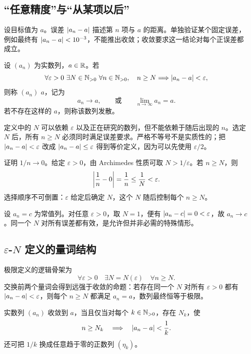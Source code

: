 \subsection{“任意精度”与“从某项以后”}

设目标值为 \(a\)。误差 \(\left|a_n-a\right|\) 描述第 \(n\) 项与 \(a\) 的距离。单独验证某个固定误差，例如最终有 \(\left|a_n-a\right|<10^{-3}\)，不能推出收敛；收敛要求这一结论对每个正误差都成立。

\begin{definition}[数列极限]
设 \((a_n)\) 为实数列，\(a\in\mathbb{R}\)。若
\[
\forall\varepsilon>0\ \exists N\in\Npos\ \forall n\in\Npos,
 \quad n\ge N\Longrightarrow\abs{a_n-a}<\varepsilon,
\]
则称 \((a_n)\)  \(a\)，记为
\[
 a_n\longrightarrow a,
 \qquad\text{或}\qquad
 \lim_{n\to\infty}a_n=a.
\]
若不存在这样的 \(a\)，则称该数列发散。
\end{definition}

定义中的 \(N\) 可以依赖 \(\varepsilon\) 以及正在研究的数列，但不能依赖于随后出现的 \(n\)。选定 \(N\) 后，所有 \(n\ge N\) 必须同时满足误差要求。严格不等号不是实质性的；把 \(\left|a_n-a\right|<\varepsilon\) 改成 \(\left|a_n-a\right|\le\varepsilon\) 得到等价定义，因为可以先使用 \(\varepsilon/2\)。

\begin{example}
证明 \(1/n\to0\)。给定 \(\varepsilon>0\)，由 Archimedes 性质可取 \(N>1/\varepsilon\)。若 \(n\ge N\)，则
\[
 \left|\frac1n-0\right|=\frac1n\le\frac1N<\varepsilon.
\]
选择顺序不可倒置：\(\varepsilon\) 给定后确定 \(N\)，这个 \(N\) 随后控制每个 \(n\ge N\)。
\end{example}

\begin{example}
设 \(a_n=c\) 为常值列。对任意 \(\varepsilon>0\)，取 \(N=1\)，便有 \(\left|a_n-c\right|=0<\varepsilon\)，故 \(a_n\to c\)。同一个 \(N\) 对所有误差都有效，是允许但并非必需的特殊情形。
\end{example}

\subsection{\texorpdfstring{\(\varepsilon\)-\(N\)}{epsilon-N} 定义的量词结构}

极限定义的逻辑骨架为
\[
 \forall\varepsilon>0\quad
 \exists N=N(\varepsilon)\quad
 \forall n\ge N.
\]
交换前两个量词会得到远强于收敛的命题：若存在同一个 \(N\) 对所有 \(\varepsilon>0\) 都有 \(\left|a_n-a\right|<\varepsilon\)，则每个 \(n\ge N\) 都满足 \(a_n=a\)，数列最终恒等于极限。

\begin{proposition}[只检验一列精度]
实数列 \((a_n)\) 收敛到 \(a\)，当且仅当对每个 \(k\in\mathbb{N}_{>0}\)，存在 \(N_k\)，使
\[
 n\ge N_k\quad\Longrightarrow\quad
 \left|a_n-a\right|<\frac1k.
\]
还可把 \(1/k\) 换成任意趋于零的正数列 \((\eta_k)\)。
\end{proposition}

